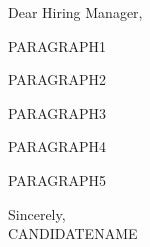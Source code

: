 \documentclass{article}
\begin{document}
\noindent Dear Hiring Manager,


PARAGRAPH1


PARAGRAPH2


PARAGRAPH3


PARAGRAPH4


PARAGRAPH5

\vspace{1cm}
\setlength{\parskip}{0em}
\begin{flushright}
Sincerely,\\
CANDIDATENAME
\end{flushright}
\end{document}
